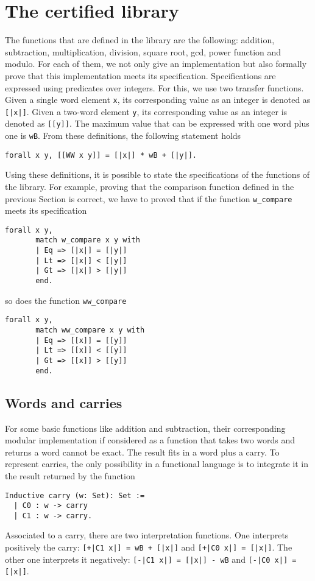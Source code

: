 \section{The certified library \label{Op}}
The functions that are defined in the library are the following:
addition, subtraction, multiplication,  division, square root, gcd, power function
and modulo. 
For each of them, we not only give an implementation but also formally prove 
that this implementation meets its specification. Specifications are expressed 
using predicates over integers. For this, we use two transfer functions.
Given a single word element {\tt x}, its corresponding value as an integer
is denoted as {\tt [|x|]}. Given a two-word element {\tt y}, its corresponding
value as an integer is denoted as {\tt [[y]]}. The maximum value that can be
expressed with one word plus one is {\tt wB}. From these definitions, the 
following statement holds
\begin{verbatim}
forall x y, [[WW x y]] = [|x|] * wB + [|y|].
\end{verbatim}
Using these definitions, it is possible to state the specifications
of the functions of the library. For example, proving that the comparison
function defined in the previous Section is correct, we have to proved
that if the function {\tt w\_compare} meets its specification
\begin{verbatim}
forall x y,
       match w_compare x y with
       | Eq => [|x|] = [|y|]
       | Lt => [|x|] < [|y|]
       | Gt => [|x|] > [|y|]
       end.
\end{verbatim}
so does the function {\tt ww\_compare}
\begin{verbatim}
forall x y,
       match ww_compare x y with
       | Eq => [[x]] = [[y]]
       | Lt => [[x]] < [[y]]
       | Gt => [[x]] > [[y]]
       end.
\end{verbatim}

\subsection{Words and carries}

For some basic functions like addition and subtraction, their corresponding
modular implementation if considered as a function that takes two words and
returns a word cannot be exact. The result fits in a word plus a carry.  
To represent carries, the only possibility in a functional language is
to integrate it in the result returned by the function 
\begin{verbatim}
Inductive carry (w: Set): Set :=
  | C0 : w -> carry
  | C1 : w -> carry.
\end{verbatim}
Associated to a carry, there are two interpretation functions.
One interprets positively the carry: {\tt [+|C1 x|] = wB + [|x|]} and
{\tt [+|C0 x|] = [|x|]}. The other one interprets it negatively:
{\tt [-|C1 x|] = [|x|] - wB} and
{\tt [-|C0 x|] = [|x|]}.

